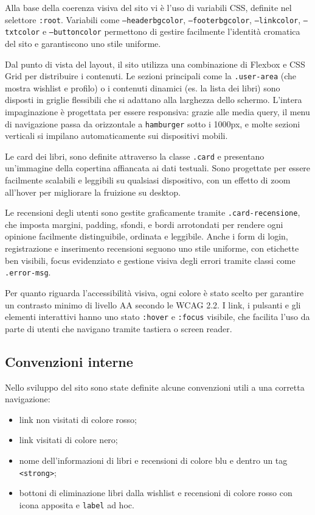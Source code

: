 \documentclass{article}
\begin{document}
\medskip

\noindent
Alla base della coerenza visiva del sito vi è l’uso di variabili CSS, definite nel selettore \texttt{:root}. Variabili come \texttt{--headerbgcolor}, \texttt{--footerbgcolor}, \texttt{--linkcolor}, \texttt{--txtcolor} e \texttt{--buttoncolor} permettono di gestire facilmente l’identità cromatica del sito e garantiscono uno stile uniforme.

Dal punto di vista del layout, il sito utilizza una combinazione di Flexbox e CSS Grid per distribuire i contenuti. Le sezioni principali come la \texttt{.user-area} (che mostra wishlist e profilo) o i contenuti dinamici (es. la lista dei libri) sono disposti in griglie flessibili che si adattano alla larghezza dello schermo. L’intera impaginazione è progettata per essere responsiva: grazie alle media query, il menu di navigazione passa da orizzontale a \texttt{hamburger} sotto i 1000px, e molte sezioni verticali si impilano automaticamente sui dispositivi mobili.

Le card dei libri, sono definite attraverso la classe \texttt{.card} e presentano un’immagine della copertina affiancata ai dati testuali. Sono progettate per essere facilmente scalabili e leggibili su qualsiasi dispositivo, con un effetto di zoom all’hover per migliorare la fruizione su desktop.

Le recensioni degli utenti sono gestite graficamente tramite \texttt{.card-recensione}, che imposta margini, padding, sfondi, e bordi arrotondati per rendere ogni opinione facilmente distinguibile, ordinata e leggibile. Anche i form di login, registrazione e inserimento recensioni seguono uno stile uniforme, con etichette ben visibili, focus evidenziato e gestione visiva degli errori tramite classi come \texttt{.error-msg}.

Per quanto riguarda l’accessibilità visiva, ogni colore è stato scelto per garantire un contrasto minimo di livello AA secondo le WCAG 2.2. I link, i pulsanti e gli elementi interattivi hanno uno stato \texttt{:hover} e \texttt{:focus} visibile, che facilita l’uso da parte di utenti che navigano tramite tastiera o screen reader.

\medskip

\subsection{Convenzioni interne}
Nello sviluppo del sito sono state definite alcune convenzioni utili a una corretta navigazione:
\begin{itemize}
    \item link non visitati di colore rosso;
    \item link visitati di colore nero;
    \item nome dell'informazioni di libri e recensioni di colore blu e dentro un tag \texttt{<strong>};
    \item bottoni di eliminazione libri dalla wishlist e recensioni di colore rosso con icona apposita e \texttt{label} ad hoc.
\end{itemize}
\end{document}
